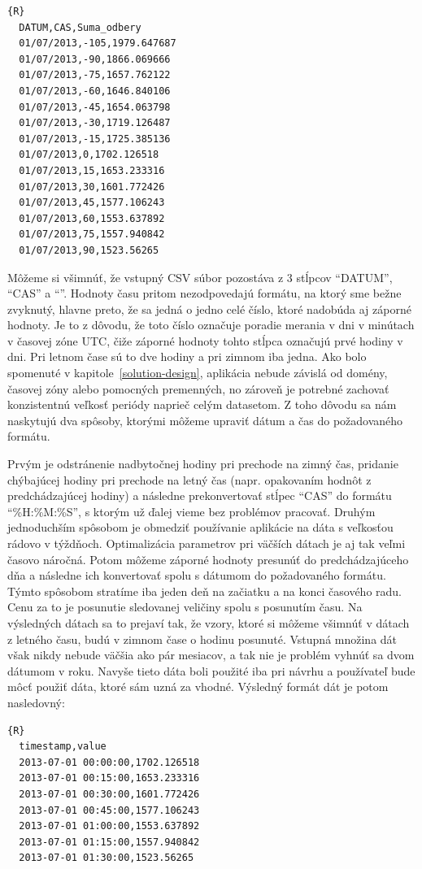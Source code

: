 \documentclass[a4paper,slovak,12pt,appendix]{article}
\begin{document}
\begin{lstlisting}{R}
  DATUM,CAS,Suma_odbery
  01/07/2013,-105,1979.647687
  01/07/2013,-90,1866.069666
  01/07/2013,-75,1657.762122
  01/07/2013,-60,1646.840106
  01/07/2013,-45,1654.063798
  01/07/2013,-30,1719.126487
  01/07/2013,-15,1725.385136
  01/07/2013,0,1702.126518
  01/07/2013,15,1653.233316
  01/07/2013,30,1601.772426
  01/07/2013,45,1577.106243
  01/07/2013,60,1553.637892
  01/07/2013,75,1557.940842
  01/07/2013,90,1523.56265
\end{lstlisting}

Môžeme si všimnúť, že vstupný CSV súbor pozostáva z 3 stĺpcov ``DATUM'', ``CAS''
a ``''. Hodnoty času pritom nezodpovedajú formátu, na ktorý sme
bežne zvyknutý, hlavne preto, že sa jedná o jedno celé číslo, ktoré nadobúda aj
záporné hodnoty. Je to z dôvodu, že toto číslo označuje poradie merania v dni
v minútach v časovej zóne UTC, čiže záporné hodnoty tohto stĺpca označujú prvé
hodiny v dni. Pri letnom čase sú to dve hodiny a pri zimnom iba jedna. Ako bolo
spomenuté v kapitole~\ref{solution-design}, aplikácia nebude závislá od domény,
časovej zóny alebo pomocných premenných, no zároveň je potrebné zachovať
konzistentnú veľkosť periódy naprieč celým datasetom. Z toho dôvodu sa nám
naskytujú dva spôsoby, ktorými môžeme upraviť dátum a čas do požadovaného
formátu.

Prvým je odstránenie nadbytočnej hodiny pri prechode na zimný čas,
pridanie chýbajúcej hodiny pri prechode na letný čas (napr. opakovaním hodnôt
z predchádzajúcej hodiny) a následne prekonvertovať stĺpec ``CAS'' do formátu
``\%H:\%M:\%S'', s ktorým už ďalej vieme bez problémov pracovať. Druhým
jednoduchším spôsobom je obmedziť používanie aplikácie na dáta s veľkosťou
rádovo v týždňoch. Optimalizácia parametrov pri väčších dátach je aj tak veľmi
časovo náročná. Potom môžeme záporné hodnoty presunúť do predchádzajúceho dňa
a následne ich konvertovať spolu s dátumom do požadovaného formátu. Týmto
spôsobom stratíme iba jeden deň na začiatku a na konci časového radu. Cenu za
to je posunutie sledovanej veličiny spolu s posunutím času. Na výsledných dátach
sa to prejaví tak, že vzory, ktoré si môžeme všimnúť v dátach z letného času,
budú v zimnom čase o hodinu posunuté. Vstupná množina dát však nikdy nebude
väčšia ako pár mesiacov, a tak nie je problém vyhnúť sa dvom dátumom v roku.
Navyše tieto dáta boli použité iba pri návrhu a používateľ bude môcť použiť
dáta, ktoré sám uzná za vhodné. Výsledný formát dát je potom nasledovný:

\begin{lstlisting}{R}
  timestamp,value
  2013-07-01 00:00:00,1702.126518
  2013-07-01 00:15:00,1653.233316
  2013-07-01 00:30:00,1601.772426
  2013-07-01 00:45:00,1577.106243
  2013-07-01 01:00:00,1553.637892
  2013-07-01 01:15:00,1557.940842
  2013-07-01 01:30:00,1523.56265
\end{lstlisting}
\end{document}
